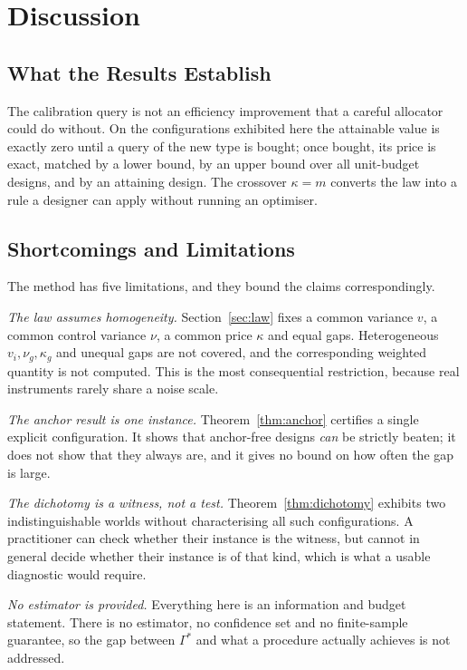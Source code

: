 \section{Discussion}
\label{sec:discussion}

\subsection{What the Results Establish}

The calibration query is not an efficiency improvement that a careful allocator could do
without. On the configurations exhibited here the attainable value is exactly zero until a
query of the new type is bought; once bought, its price is exact, matched by a lower bound,
by an upper bound over all unit-budget designs, and by an attaining design. The crossover
$\kappa=m$ converts the law into a rule a designer can apply without running an optimiser.

\subsection{Shortcomings and Limitations}

The method has five limitations, and they bound the claims correspondingly.

\emph{The law assumes homogeneity.} Section~\ref{sec:law} fixes a common variance $v$, a
common control variance $\nu$, a common price $\kappa$ and equal gaps. Heterogeneous
$v_{i},\nu_{g},\kappa_{g}$ and unequal gaps are not covered, and the corresponding weighted
quantity is not computed. This is the most consequential restriction, because real
instruments rarely share a noise scale.

\emph{The anchor result is one instance.} Theorem~\ref{thm:anchor} certifies a single
explicit configuration. It shows that anchor-free designs \emph{can} be strictly beaten; it
does not show that they always are, and it gives no bound on how often the gap is large.

\emph{The dichotomy is a witness, not a test.} Theorem~\ref{thm:dichotomy} exhibits two
indistinguishable worlds without characterising all such configurations. A practitioner can
check whether their instance is the witness, but cannot in general decide whether their
instance is of that kind, which is what a usable diagnostic would require.

\emph{No estimator is provided.} Everything here is an information and budget statement.
There is no estimator, no confidence set and no finite-sample guarantee, so the gap between
$\Gamma^{*}$ and what a procedure actually achieves is not addressed.

